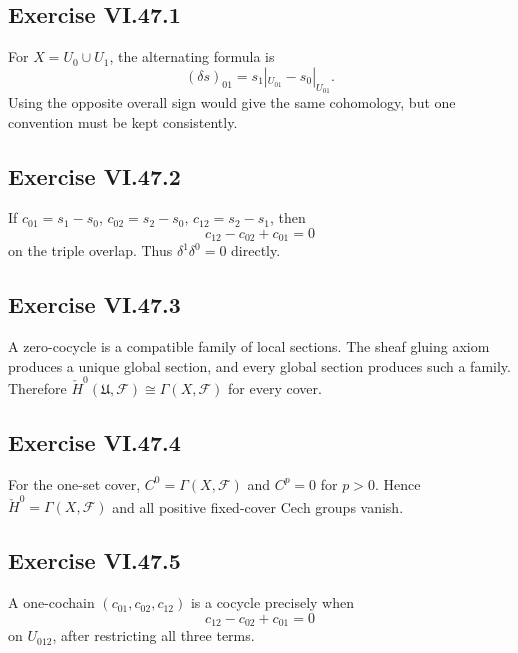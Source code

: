 \subsection*{Exercise VI.47.1}
\begin{solution}
For \(X=U_0\cup U_1\), the alternating formula is
\[
(\delta s)_{01}=s_1|_{U_{01}}-s_0|_{U_{01}}.
\]
Using the opposite overall sign would give the same cohomology, but one convention must be kept consistently.
\end{solution}

\subsection*{Exercise VI.47.2}
\begin{solution}
If \(c_{01}=s_1-s_0\), \(c_{02}=s_2-s_0\), \(c_{12}=s_2-s_1\), then
\[
c_{12}-c_{02}+c_{01}=0
\]
on the triple overlap.  Thus \(\delta^1\delta^0=0\) directly.
\end{solution}

\subsection*{Exercise VI.47.3}
\begin{solution}
A zero-cocycle is a compatible family of local sections.  The sheaf gluing axiom produces a unique global section, and every global section produces such a family.  Therefore \(\check H^0(\mathfrak U,\mathcal F)\cong\Gamma(X,\mathcal F)\) for every cover.
\end{solution}

\subsection*{Exercise VI.47.4}
\begin{solution}
For the one-set cover, \(C^0=\Gamma(X,\mathcal F)\) and \(C^p=0\) for \(p>0\).  Hence \(\check H^0=\Gamma(X,\mathcal F)\) and all positive fixed-cover Cech groups vanish.
\end{solution}

\subsection*{Exercise VI.47.5}
\begin{solution}
A one-cochain \((c_{01},c_{02},c_{12})\) is a cocycle precisely when
\[
c_{12}-c_{02}+c_{01}=0
\]
on \(U_{012}\), after restricting all three terms.
\end{solution}

